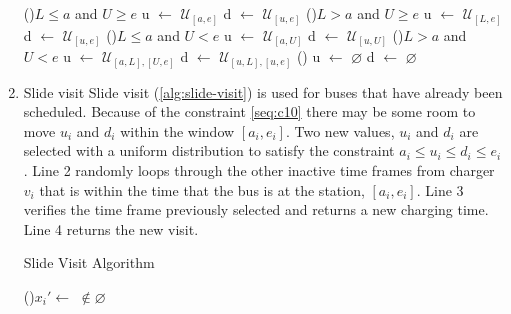 \documentclass[ee,msthesis]{usuthesis}
\newcommand{\I}{\mathbb{I}}                 %
\newcommand{\C}{\mathbb{C}}                 %
\newcommand{\U}{\mathcal{U}}                %
\newcommand{\Sol}{\mathbb{S}}               %
\begin{document}
\begin{enumerate}
\begin{algorithm}[h]
    \Begin
    {
        \If(\tcc*[f]{If $L < a < e < U]$ (\autoref{subfig:sandwich})}){$L \leq a$ and $U \geq e$}
        {
                u $\leftarrow$ $\U_{[a,e]}$\;
                d $\leftarrow$ $\U_{[u,e]}$\;
        }
        \ElseIf(){$L > a$ and $U \geq e$}
        {
                u $\leftarrow$ $\U_{[L,e]}$\;
                d $\leftarrow$ $\U_{[u,e]}$\;
        }
        \ElseIf(){$L \leq a$ and $U < e$}
        {
                u $\leftarrow$ $\U_{[a,U]}$\;
                d $\leftarrow$ $\U_{[u,U]}$\;
        }
        \ElseIf(){$L > a$ and $U < e$}
        {
                u $\leftarrow$ $\U_{[a,L], [U,e]}$\;
                d $\leftarrow$ $\U_{[u,L], [u,e]}$\;
        }
        \Else()
        {
                u $\leftarrow$ $\varnothing$\;
                d $\leftarrow$ $\varnothing$\;
        }

    }
\end{algorithm}

\item Slide visit
\label{slide-visit}
Slide visit (\ref{alg:slide-visit}) is used for buses that have already been scheduled. Because of the constraint
\ref{seq:c10} there may be some room to move \(u_i\) and \(d_i\) within the window \([a_i, e_i]\). Two new values, \(u_i\) and
\(d_i\) are selected with a uniform distribution to satisfy the constraint \(a_i \leq u_i \leq d_i \leq e_i\). Line 2 randomly loops
through the other inactive time frames from charger \(v_i\) that is within the time that the bus is at the station, \([a_i,
e_i]\). Line 3 verifies the time frame previously selected and returns a new charging time. Line 4 returns the new visit.

\begin{algorithm}[H]
\caption{Slide Visit Algorithm} \label{alg:slide-visit}
    \LinesNumbered
    \KwIn{$\Sol$}
    \KwOut{$\I_i'$}

    \Begin
    {
        \While {$C_q^j \in \{[a_i, e_i]\} \subset \U_{\C_{v_i}}$}
        {
            \If(){$x_i' \leftarrow$  $\not\in \varnothing$}
            {
                \Return{$\I_i \leftarrow x_i'$} 
            }
        }
    }
\end{algorithm}


\end{enumerate}
\end{document}

